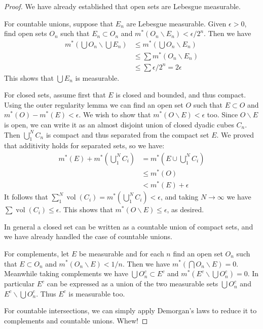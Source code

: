 \documentclass[11pt,oneside]{amsbook}
\renewcommand{\setminus}{\smallsetminus}
\DeclareMathOperator{\vol}{vol}
\theoremstyle{definition}
\theoremstyle{plain}
\theoremstyle{definition}
\theoremstyle{remark}
\numberwithin{equation}{section}
\numberwithin{figure}{section}
\begin{document}
\begin{proof}
  We have already established that open sets are Lebesgue measurable.

  For countable unions, suppose that $E_n$ are Lebesgue measurable. Given $\epsilon>0$, find open sets $O_n$ such that $E_n\subset O_n$ and $m^*(O_n\setminus E_n)<\epsilon/2^n$. Then we have
  \begin{align*}
    m^*(\bigcup O_n\smallsetminus\bigcup E_n)
    &\leq m^*(\bigcup O_n\setminus E_n)\\
    &\leq \sum m^*(O_n\setminus E_n)\\
    &\leq \sum \epsilon/2^n=2\epsilon
  \end{align*}
  This shows that $\bigcup E_n$ is measurable.

  For closed sets, assume first that $E$ is closed and bounded, and thus compact. Using the outer regularity lemma we can find an open set $O$ such that $E\subset O$ and $m^*(O)-m^*(E)<\epsilon$. We wish to show that $m^*(O\setminus E)<\epsilon$ too. Since $O\setminus E$ is open, we can write it as an almost disjoint union of closed dyadic cubes $C_n$. Then $\bigcup_1^N C_n$ is compact and thus separated from the compact set $E$. We proved that additivity holds for separated sets, so we have:
  \begin{align*}
    m^*(E)+m^*(\bigcup_1^NC_i)&=m^*(E\cup\bigcup_1^NC_i)\\
                              &\leq m^*(O)\\
                              &<m^*(E)+\epsilon
  \end{align*}
  It follows that $\sum_1^N\vol(C_i)=m^*(\bigcup_1^NC_i)<\epsilon$, and taking $N\to\infty$ we have $\sum\vol(C_i)\leq\epsilon$. This shows that $m^*(O\setminus E)\leq\epsilon$, as desired.

  In general a closed set can be written as a countable union of compact sets, and we have already handled the case of countable unions.

  For complements, let $E$ be measurable and for each $n$ find an open set $O_n$ such that $E\subset O_n$ and $m^*(O_n\setminus E)<1/n$. Then we have $m^*(\bigcap O_n\setminus E)=0$. Meanwhile taking complements we have $\bigcup O_n^c\subset E^c$ and $m^*(E^c\setminus\bigcup O_n^c)=0$. In particular $E^c$ can be expressed as a union of the two measurable sets $\bigcup O_n^c$ and $E^c\setminus\bigcup O_n^c$. Thus $E^c$ is measurable too.

  For countable intersections, we can simply apply Demorgan's laws to reduce it to complements and countable unions. Whew!
\end{proof}
\end{document}
